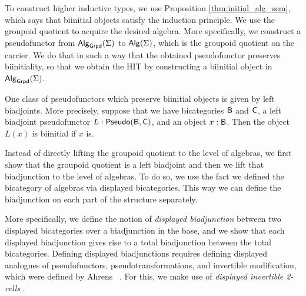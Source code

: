 To construct higher inductive types, we use Proposition \ref{thm:initial_alg_sem}, which says that biinitial objects satisfy the induction principle.
We use the groupoid quotient to acquire the desired algebra.
More specifically, we construct a pseudofunctor from $\mathsf{Alg}_{\mathsf{Grpd}}(\Sigma)$ to $\mathsf{Alg}(\Sigma)$,
which is the groupoid quotient on the carrier.
We do that in such a way that the obtained pseudofunctor preserves biinitiality,
so that we obtain the HIT by constructing a biinitial object in $\mathsf{Alg}_{\mathsf{Grpd}}(\Sigma)$.

One class of pseudofunctors which preserve biinitial objects is given by left biadjoints.
More precisely, suppose that we have bicategories $\mathsf{B}$ and $\mathsf{C}$, a left biadjoint pseudofunctor $L : \mathsf{Pseudo}(\mathsf{B}, \mathsf{C})$, and an object $x : \mathsf{B}$.
Then the object $L(x)$ is biinitial if $x$ is.

Instead of directly lifting the groupoid quotient to the level of algebras,
we first show that the groupoid quotient is a left biadjoint and then we lift that biadjunction to the level of algebras.
To do so, we use the fact we defined the bicategory of algebras via displayed bicategories.
This way we can define the biadjunction on each part of the structure separately.

More specifically, we define the notion of \emph{displayed biadjunction} between two displayed bicategories over a biadjunction in the base,
and we show that each displayed biadjunction gives rise to a total biadjunction between the total bicategories.
Defining displayed biadjunctions requires defining displayed analogues of pseudofunctors, pseudotransformations, and invertible modification,
which were defined by Ahrens \etal \ \cite{bicatjournal}.
For this, we make use of \emph{displayed invertible 2-cells} \cite{bicatjournal}.

